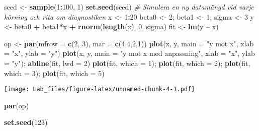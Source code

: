 \documentclass[
  11pt,
]{article}
\newenvironment{Shaded}{\begin{snugshade}}{\end{snugshade}}
\newcommand{\AttributeTok}[1]{\textcolor[rgb]{0.13,0.29,0.53}{#1}}
\newcommand{\CommentTok}[1]{\textcolor[rgb]{0.56,0.35,0.01}{\textit{#1}}}
\newcommand{\DecValTok}[1]{\textcolor[rgb]{0.00,0.00,0.81}{#1}}
\newcommand{\FunctionTok}[1]{\textcolor[rgb]{0.13,0.29,0.53}{\textbf{#1}}}
\newcommand{\NormalTok}[1]{#1}
\newcommand{\OtherTok}[1]{\textcolor[rgb]{0.56,0.35,0.01}{#1}}
\newcommand{\SpecialCharTok}[1]{\textcolor[rgb]{0.81,0.36,0.00}{\textbf{#1}}}
\newcommand{\StringTok}[1]{\textcolor[rgb]{0.31,0.60,0.02}{#1}}
\begin{document}
\begin{Shaded}
\begin{Highlighting}[]
\NormalTok{seed }\OtherTok{\textless{}{-}} \FunctionTok{sample}\NormalTok{(}\DecValTok{1}\SpecialCharTok{:}\DecValTok{100}\NormalTok{, }\DecValTok{1}\NormalTok{)}
\FunctionTok{set.seed}\NormalTok{(seed)}
\CommentTok{\# Simulera en ny datamängd vid varje körning och rita om diagnostiken}
\NormalTok{x }\OtherTok{\textless{}{-}} \DecValTok{1}\SpecialCharTok{:}\DecValTok{20}
\NormalTok{beta0 }\OtherTok{\textless{}{-}} \DecValTok{2}\NormalTok{; beta1 }\OtherTok{\textless{}{-}} \DecValTok{1}\NormalTok{; sigma }\OtherTok{\textless{}{-}} \DecValTok{3}
\NormalTok{y }\OtherTok{\textless{}{-}}\NormalTok{ beta0 }\SpecialCharTok{+}\NormalTok{ beta1}\SpecialCharTok{*}\NormalTok{x }\SpecialCharTok{+} \FunctionTok{rnorm}\NormalTok{(}\FunctionTok{length}\NormalTok{(x), }\DecValTok{0}\NormalTok{, sigma)}
\NormalTok{fit }\OtherTok{\textless{}{-}} \FunctionTok{lm}\NormalTok{(y }\SpecialCharTok{\textasciitilde{}}\NormalTok{ x)}

\NormalTok{op }\OtherTok{\textless{}{-}} \FunctionTok{par}\NormalTok{(}\AttributeTok{mfrow =} \FunctionTok{c}\NormalTok{(}\DecValTok{2}\NormalTok{, }\DecValTok{3}\NormalTok{), }\AttributeTok{mar =} \FunctionTok{c}\NormalTok{(}\DecValTok{4}\NormalTok{,}\DecValTok{4}\NormalTok{,}\DecValTok{2}\NormalTok{,}\DecValTok{1}\NormalTok{))}
\FunctionTok{plot}\NormalTok{(x, y, }\AttributeTok{main =} \StringTok{"y mot x"}\NormalTok{, }\AttributeTok{xlab =} \StringTok{"x"}\NormalTok{, }\AttributeTok{ylab =} \StringTok{"y"}\NormalTok{)}
\FunctionTok{plot}\NormalTok{(x, y, }\AttributeTok{main =} \StringTok{"y mot x med anpassning"}\NormalTok{, }\AttributeTok{xlab =} \StringTok{"x"}\NormalTok{, }\AttributeTok{ylab =} \StringTok{"y"}\NormalTok{); }\FunctionTok{abline}\NormalTok{(fit, }\AttributeTok{lwd =} \DecValTok{2}\NormalTok{)}
\FunctionTok{plot}\NormalTok{(fit, }\AttributeTok{which =} \DecValTok{1}\NormalTok{); }\FunctionTok{plot}\NormalTok{(fit, }\AttributeTok{which =} \DecValTok{2}\NormalTok{); }\FunctionTok{plot}\NormalTok{(fit, }\AttributeTok{which =} \DecValTok{3}\NormalTok{); }\FunctionTok{plot}\NormalTok{(fit, }\AttributeTok{which =} \DecValTok{5}\NormalTok{)}
\end{Highlighting}
\end{Shaded}

\texttt{[image: Lab\_files/figure-latex/unnamed-chunk-4-1.pdf]}

\begin{Shaded}
\begin{Highlighting}[]
\FunctionTok{par}\NormalTok{(op)}

\FunctionTok{set.seed}\NormalTok{(}\DecValTok{123}\NormalTok{)}
\end{Highlighting}
\end{Shaded}
\end{document}
